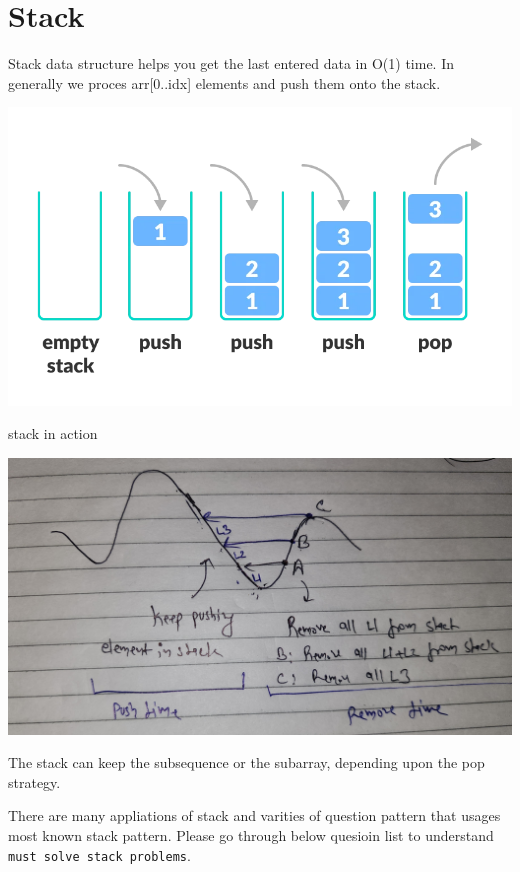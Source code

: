 \chapter{Stack}\label{chp:stack}

Stack data structure helps you get the last entered data in O(1) time.
In generally we proces arr[0..idx] elements and push them onto the stack.

\begin{marginfigure}  
\includegraphics[width=\marginparwidth]{../resources/stack_intro.png}
\caption{stack in action}
\end{marginfigure}

\includegraphics[width=2\marginparwidth]{resources/monotonic-decreasing-stack.jpg}


The stack can keep the subsequence or the subarray, depending upon the pop strategy.

There are many appliations of stack and varities of question pattern that usages most known stack pattern.
Please go through below quesioin list to understand \verb|must solve stack problems|.

